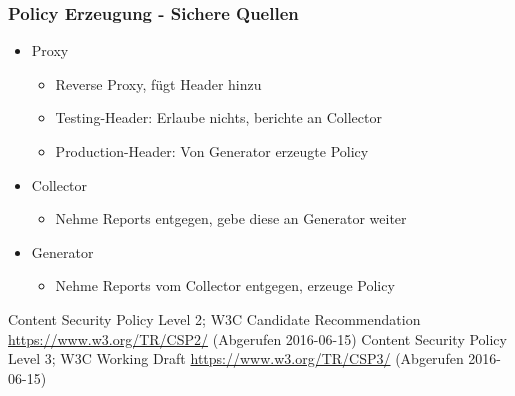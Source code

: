 \documentclass[handout]{beamer}
\begin{document}
\begin{frame}[c]
\frametitle{Policy Erzeugung - Sichere Quellen}
\begin{itemize}
\item Proxy
\begin{itemize}
\item Reverse Proxy, fügt Header hinzu
\item Testing-Header: Erlaube nichts, berichte an Collector
\item Production-Header: Von Generator erzeugte Policy
\end{itemize}
\item Collector
\begin{itemize}
\item Nehme Reports entgegen, gebe diese an Generator weiter
\end{itemize}
\item Generator
\begin{itemize}
\item Nehme Reports vom Collector entgegen, erzeuge Policy
\end{itemize}
\end{itemize}
\end{frame}

\begin{frame}[c]
\end{frame}

\begin{thebibliography}{}
Content Security Policy Level 2; W3C Candidate Recommendation \url{https://www.w3.org/TR/CSP2/} (Abgerufen 2016-06-15)
Content Security Policy Level 3; W3C Working Draft \url{https://www.w3.org/TR/CSP3/} (Abgerufen 2016-06-15)
\end{thebibliography}
\end{document}
